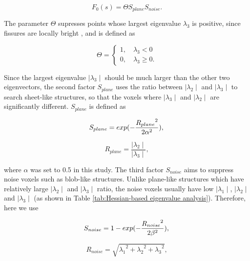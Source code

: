 {\begin{equation}
\label{eq:FissureHessian1}
F_0(s) = \Theta S_{plane} S_{noise}.
\end{equation}

The parameter $\Theta$ supresses points whose largest eigenvalue $\lambda_{3}$ is positive, since fissures are locally bright , and is defined as

\begin{equation}
\label{eq:FissureHessian2}
\Theta = \begin{cases}
         1,\quad \lambda_{3}< 0\\
         0, \quad \lambda_{3}\geq0.
         \end{cases}
\end{equation}

Since the largest eigenvalue $\mid\lambda_{3}\mid$ should be much larger than the other two eigenvectors, the second factor $S_{plane}$ uses the ratio between $\mid\lambda_{2}\mid$ and $\mid\lambda_{3}\mid$ to search sheet-like structures, so that the voxels where $\mid\lambda_{3}\mid$ and $\mid\lambda_{2}\mid$ are significantly different. $S_{plane}$ is defined as

\begin{equation}
\label{eq:FissureHessian3}
S_{plane} = exp(-\frac{{R_{plane}}^2}{2\alpha^2}), \\
\end{equation}

\begin{equation}
\label{eq:FissureHessian4}
R_{plane} = \frac{\mid\lambda_{2}\mid}{\mid\lambda_{3}\mid},
\end{equation}

\noindent where $\alpha$ was set to 0.5 in this study. The third factor $S_{noise}$ aims to suppress noise voxels such as blob-like structures. Unlike plane-like structures which have relatively large $\mid\lambda_{2}\mid$ and $\mid\lambda_{3}\mid$ ratio, the noise voxels usually have low $\mid\lambda_{1}\mid$, $\mid\lambda_{2}\mid$ and $\mid\lambda_{3}\mid$ (as shown in Table \ref{tab:Hessian-based eigenvalue analysis}). Therefore, here we use

\begin{equation}
\label{eq:FissureHessian5}
S_{noise} = 1 - exp(-\frac{{R_{noise}}^2}{2\beta^2}), \\
\end{equation}

\begin{equation}
\label{eq:FissureHessian6}
R_{noise} = \sqrt{{\lambda_1}^2+{\lambda_2}^2+{\lambda_3}^2},
\end{equation}

}

